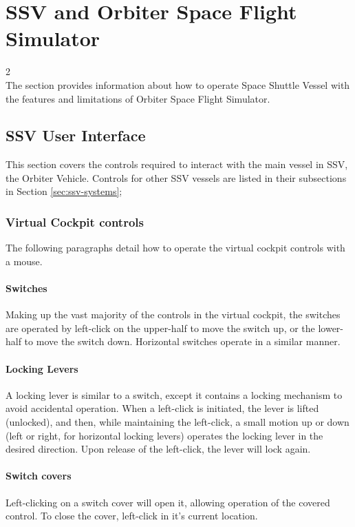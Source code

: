 \documentclass[Space_Shuttle_Vessel_Manual.tex]{subfiles}
\begin{document}
\section{SSV and Orbiter Space Flight Simulator}
\begin{multicols*}{2}
\renewcommand{\cfttoctitlefont}{\bf}
\localtableofcontents
\noindent
\\
The section provides information about how to operate Space Shuttle Vessel with the features and limitations of Orbiter Space Flight Simulator.
\newpage


\subsection{SSV User Interface}
This section covers the controls required to interact with the main vessel in SSV, the Orbiter Vehicle. Controls for other SSV vessels are listed in their subsections in Section \ref{sec:ssv-systems};


\subsubsection{Virtual Cockpit controls}
The following paragraphs detail how to operate the virtual cockpit controls with a mouse.

\paragraph{Switches}
Making up the vast majority of the controls in the virtual cockpit, the switches are operated by left-click on the upper-half to move the switch up, or the lower-half to move the switch down. Horizontal switches operate in a similar manner.

\paragraph{Locking Levers}
A locking lever is similar to a switch, except it contains a locking mechanism to avoid accidental operation. When a left-click is initiated, the lever is lifted (unlocked), and then, while maintaining the left-click, a small motion up or down (left or right, for horizontal locking levers) operates the locking lever in the desired direction. Upon release of the left-click, the lever will lock again.

\paragraph{Switch covers}
Left-clicking on a switch cover will open it, allowing operation of the covered control. To close the cover, left-click in it's current location.


\end{multicols*}
\end{document}
